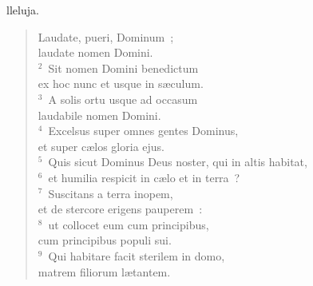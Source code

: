 \bchapter[Psalm]
lleluja. \begin{verse}Laudate, pueri, Dominum~;\\ laudate nomen Domini.\\
${}^{2}$~Sit nomen Domini benedictum\\ ex hoc nunc et usque in s\ae culum.\\
${}^{3}$~A solis ortu usque ad occasum\\ laudabile nomen Domini.\\
${}^{4}$~Excelsus super omnes gentes Dominus,\\ et super c\ae los gloria ejus.\\
${}^{5}$~Quis sicut Dominus Deus noster, qui in altis habitat,\\
${}^{6}$~et humilia respicit in c\ae lo et in terra~?\\
${}^{7}$~Suscitans a terra inopem,\\ et de stercore erigens pauperem~:\\
${}^{8}$~ut collocet eum cum principibus,\\ cum principibus populi sui.\\
${}^{9}$~Qui habitare facit sterilem in domo,\\ matrem filiorum l\ae tantem.\end{verse}



